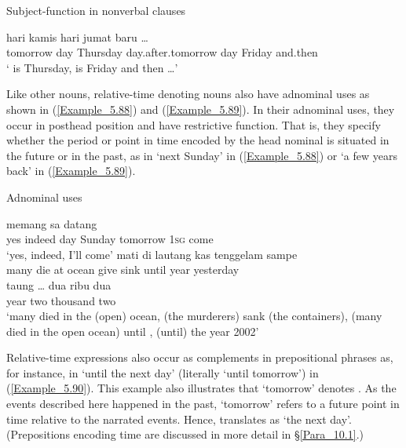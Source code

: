 \begin{styleExampleTitle}
Subject-function in nonverbal clauses
\end{styleExampleTitle}

\ea
\label{Example_5.87}
 {hari} {kamis} {} {hari} {jumat} {baru} {{\ldots}}\\ %
 tomorrow  day  Thursday  day.after.tomorrow  day  Friday  and.then  \\
\glt 
‘ is Thursday,  is Friday and then {\ldots}’ \textstyleExampleSource{[080917-003a-CvEx.0006]}
\z


Like other nouns, relative-time denoting nouns also have adnominal uses as shown in (\ref{Example_5.88}) and (\ref{Example_5.89}). In their adnominal uses, they occur in posthead position and have restrictive function. That is, they specify whether the period or point in time encoded by the head nominal is situated in the future or in the past, as in  ‘next Sunday’ in (\ref{Example_5.88}) or  ‘a few years back’ in (\ref{Example_5.89}).


\begin{styleExampleTitle}
Adnominal uses
\end{styleExampleTitle}

\ea
\label{Example_5.88}
 {memang} {} {} {} {sa} {datang}\\ %
 yes  indeed  day  Sunday  tomorrow  \textsc{1sg}  come\\
\glt 
‘yes, indeed,  I’ll come’ \textstyleExampleSource{[080922-001a-CvPh.0346]}
\z
\ea
\label{Example_5.89}
 {{mati}} {di} {{lautang}} {kas} {tenggelam} {sampe} {} {}\\ %
 {many}  {die}  at  {ocean}  give  sink  until  year  yesterday\\
 \gll  taung  {{\ldots}}  dua  {ribu}  {dua}\\
 year  {}  two  {thousand}  {two}\\
 ‘many died in the (open) ocean, (the murderers) sank (the containers), (many died in the open ocean) until , (until) the year 2002’ \textstyleExampleSource{[081029-002-Cv.0025]}
\z


Relative-time expressions also occur as complements in prepositional phrases as, for instance, in  ‘until the next day’ (literally ‘until tomorrow’) in (\ref{Example_5.90}). This example also illustrates that  ‘tomorrow’ denotes . As the events described here happened in the past,  ‘tomorrow’ refers to a future point in time relative to the narrated events. Hence,  translates as ‘the next day’. (Prepositions encoding time are discussed in more detail in §\ref{Para_10.1}.)


